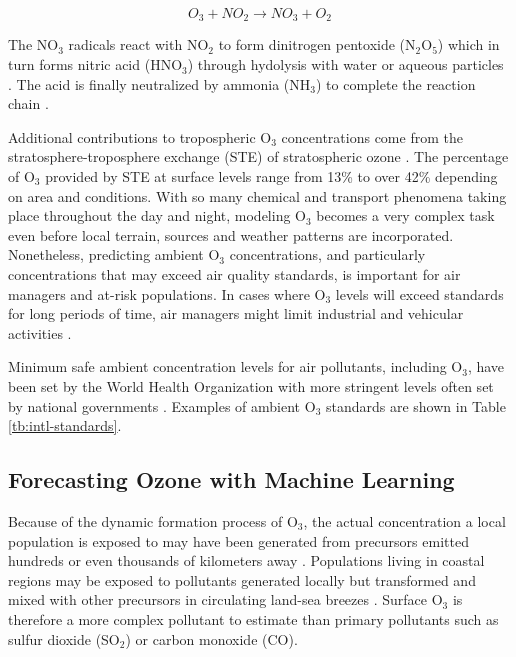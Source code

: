 \documentclass[preprint,12pt,authoryear]{elsarticle}
\begin{document}
\begin{linenumbers}
\begin{equation}
\label{eq:nitrateformation}
O_{3} + NO_{2}\rightarrow NO_{3}+O_{2} 
\end{equation}

The NO$_{3}$ radicals react with NO$_{2}$ to form dinitrogen pentoxide (N$_{2}$O$_{5}$) which in turn forms nitric acid (HNO$_{3}$) through hydolysis with water or aqueous particles \citep{Song2011}. The acid is finally neutralized by ammonia (NH$_{3}$) to complete the reaction chain \citep{Brown2012}.

Additional contributions to tropospheric O$_{3}$ concentrations come from the stratosphere-troposphere exchange (STE) of stratospheric ozone \citep{Tarasick2008}. The percentage of O$_{3}$ provided by STE at surface levels range from 13\% \citep{Cooper2006} to over 42\% \citep{Lelieveld2000} depending on area and conditions. With so many chemical and transport phenomena taking place throughout the day and night, modeling O$_{3}$ becomes a very complex task even before local terrain, sources and weather patterns are incorporated. Nonetheless, predicting ambient O$_{3}$ concentrations, and particularly concentrations that may exceed air quality standards, is important for air managers and at-risk populations.  In cases where O$_{3}$ levels will exceed standards for long periods of time, air managers might limit industrial and vehicular activities \citep{Kuhlbusch2014, Welch2005}. 

Minimum safe ambient concentration levels for air pollutants, including O$_{3}$, have been set by the World Health Organization \citep{WHO2006} with more stringent levels often set by national governments \citep{USEPA2016}. Examples of ambient O$_{3}$ standards are shown in Table \ref{tb:intl-standards}.\\

	

\subsection{Forecasting Ozone with Machine Learning}

Because of the dynamic formation process of O$_{3}$, the actual concentration a local population is exposed to may have been generated from precursors emitted hundreds or even thousands of kilometers away \citep{Glavas2011}. Populations living in coastal regions may be exposed to pollutants generated locally but transformed and mixed with other precursors in circulating land-sea breezes \citep{Freeman2016a}. Surface O$_{3}$ is therefore a more complex pollutant to estimate than primary pollutants such as sulfur dioxide (SO$_{2}$) or carbon monoxide (CO).


\end{linenumbers}
\end{document}
